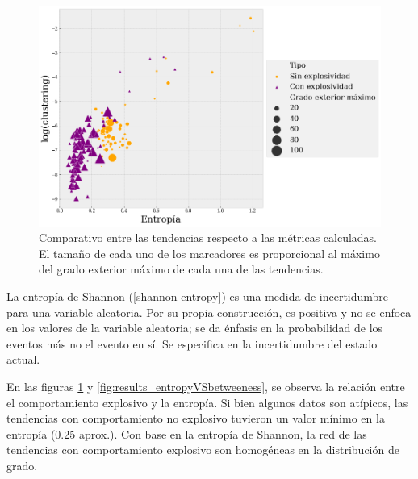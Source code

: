 \documentclass[../main.tex]{subfiles}
\begin{document}
\begin{figure}[h!]
    \centering
    \includegraphics[scale = 0.40]{images/results_entropyVSclustering.png}
    \caption{Comparativo entre las tendencias respecto a las métricas calculadas. El tamaño de cada uno de los marcadores es proporcional al máximo del grado exterior máximo de cada una de las tendencias. }
    \label{fig:results_entropyVSclustering}
\end{figure}

La entropía de Shannon (\ref{shannon-entropy}) es una medida de incertidumbre para una variable aleatoria. Por su propia construcción, es positiva  y  no se enfoca en los valores de la variable aleatoria; se da énfasis en la probabilidad de los eventos más no el evento en sí. Se especifica en la incertidumbre del estado actual. 

En las figuras \ref{fig:results_entropyVSclustering} y \ref{fig:results_entropyVSbetweeness}, se observa la relación entre el comportamiento explosivo y la  entropía. Si bien algunos datos son atípicos, las tendencias con comportamiento no explosivo tuvieron un valor mínimo en la entropía (0.25 aprox.). Con base en la entropía de Shannon, la red de las tendencias con comportamiento explosivo son homogéneas en la distribución de grado. 
\end{document}

